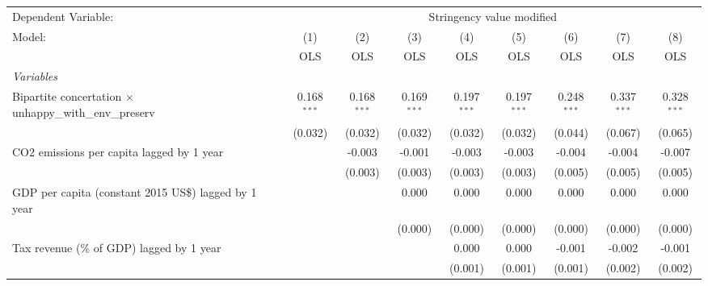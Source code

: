 
\begingroup
\centering
\begin{tabular}{lcccccccc}
   \toprule
   Dependent Variable: & \multicolumn{8}{c}{Stringency value modified}\\
   Model:                                                          & (1)           & (2)           & (3)           & (4)           & (5)           & (6)           & (7)           & (8)\\  
                                                                   &  OLS          & OLS           & OLS           & OLS           & OLS           & OLS           & OLS           & OLS\\  
   \midrule
   \emph{Variables}\\
   Bipartite concertation $\times$ unhappy\_with\_env\_preserv     & 0.168$^{***}$ & 0.168$^{***}$ & 0.169$^{***}$ & 0.197$^{***}$ & 0.197$^{***}$ & 0.248$^{***}$ & 0.337$^{***}$ & 0.328$^{***}$\\   
                                                                   & (0.032)       & (0.032)       & (0.032)       & (0.032)       & (0.032)       & (0.044)       & (0.067)       & (0.065)\\   
   CO2 emissions per capita lagged by 1 year                       &               & -0.003        & -0.001        & -0.003        & -0.003        & -0.004        & -0.004        & -0.007\\   
                                                                   &               & (0.003)       & (0.003)       & (0.003)       & (0.003)       & (0.005)       & (0.005)       & (0.005)\\   
   GDP per capita (constant 2015 US\$) lagged by 1 year            &               &               & 0.000         & 0.000         & 0.000         & 0.000         & 0.000         & 0.000\\   
                                                                   &               &               & (0.000)       & (0.000)       & (0.000)       & (0.000)       & (0.000)       & (0.000)\\   
   Tax revenue (\% of GDP) lagged by 1 year                        &               &               &               & 0.000         & 0.000         & -0.001        & -0.002        & -0.001\\   
                                                                   &               &               &               & (0.001)       & (0.001)       & (0.001)       & (0.002)       & (0.002)\\   

\end{tabular}
